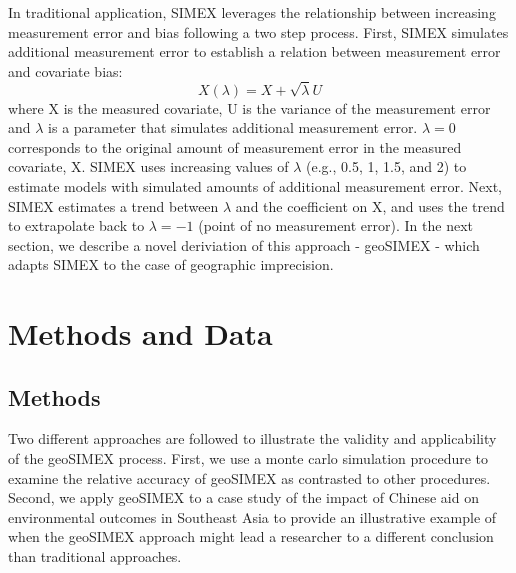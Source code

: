 In traditional application, SIMEX leverages the relationship between increasing measurement error and bias following a two step process. 
First, SIMEX simulates additional measurement error to establish a relation between measurement error and covariate bias:
\begin{equation}
X(\lambda) = X + \sqrt{\lambda}U
\end{equation}
where X is the measured covariate, U is the variance of the measurement error and $\lambda$ is a parameter that simulates additional measurement error. 
$\lambda=0$ corresponds to the original amount of measurement error in the measured covariate, X. 
SIMEX uses increasing values of $\lambda$ (e.g., 0.5, 1, 1.5, and 2) to estimate models with simulated amounts of additional measurement error. 
Next, SIMEX estimates a trend between $\lambda$ and the coefficient on X, and uses the trend to extrapolate back to $\lambda = -1$ (point of no measurement error).  In the next section, we describe a novel deriviation of this approach - geoSIMEX - which adapts SIMEX to the case of geographic imprecision.  








\section{Methods and Data}
\subsection{Methods}
Two different approaches are followed to illustrate the validity and applicability of the geoSIMEX process.
First, we use a monte carlo simulation procedure to examine the relative accuracy of geoSIMEX as contrasted to other procedures.  
Second, we apply geoSIMEX to a case study of the impact of Chinese aid on environmental outcomes in Southeast Asia to provide an illustrative example of when the geoSIMEX approach might lead a researcher to a different conclusion than traditional approaches.

